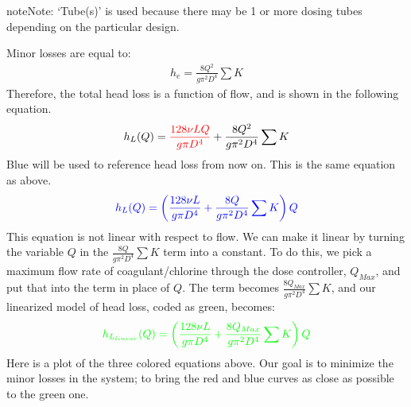 \documentclass[letterpaper,10pt,english]{sphinxmanual}
\begin{document}
\begin{sphinxadmonition}{note}{Note:}
‘Tube(s)’ is used because there may be 1 or more dosing tubes depending on the particular design.
\end{sphinxadmonition}

Minor losses are equal to:
\begin{equation}\label{equation:Flow_Control_and_Measurement/FCM_Derivations:Flow_Control_and_Measurement/FCM_Derivations:21}
\begin{split}h_e = \frac{8 Q^2}{g \pi^2 D^4} \sum{K}\end{split}
\end{equation}
Therefore, the total head loss is a function of flow, and is shown in the following equation.
\begin{equation}\label{equation:Flow_Control_and_Measurement/FCM_Derivations:Flow_Control_and_Measurement/FCM_Derivations:22}
\begin{split}h_L(Q) =
{\color{red}{
  \frac{128\nu L Q}{g \pi D^4}}} +
  \frac{8Q^2}{g \pi^2 D^4} \sum K\end{split}
\end{equation}
Blue will be used to reference  head loss from now on. This is the same equation as above.
\begin{equation}\label{equation:Flow_Control_and_Measurement/FCM_Derivations:Flow_Control_and_Measurement/FCM_Derivations:23}
\begin{split}\color{blue}{
  h_L(Q) = \left( \frac{128\nu L}{g \pi D^4} + \frac{8Q}{g \pi ^2 D^4} \sum{K} \right) Q
  }\end{split}
\end{equation}
This equation is not linear with respect to flow. We can make it linear by turning the variable \(Q\) in the \(\frac{8Q}{g \pi ^2 D^4} \sum{K}\) term into a constant. To do this, we pick a maximum flow rate of coagulant/chlorine through the dose controller, \(Q_{Max}\), and put that into the term in place of \(Q\). The term becomes \(\frac{8Q_{Max}}{g \pi ^2 D^4} \sum{K}\), and our linearized model of head loss, coded as green, becomes:
\begin{equation}\label{equation:Flow_Control_and_Measurement/FCM_Derivations:Flow_Control_and_Measurement/FCM_Derivations:24}
\begin{split}\color{green}{
  h_{L_{linear}}(Q) = \left( \frac{128\nu L}{g \pi D^4} + \frac{8Q_{Max}}{g \pi ^2 D^4} \sum{K} \right) Q
  }\end{split}
\end{equation}
Here is a plot of the three colored equations above. Our goal is to minimize the minor losses in the system; to bring the red and blue curves as close as possible to the green one.
\end{document}
